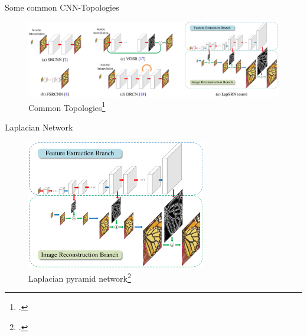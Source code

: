 \documentclass{beamer}
\begin{document}
\begin{frame}{Some common CNN-Topologies}
  \begin{figure}[h]
    \centering
    \includegraphics[width=\textwidth]{sr_architectures.png}
    \caption{Common Topologies\footcite{LapSRN}}
    \label{fig:lap-srn}
  \end{figure}
\end{frame}

\begin{frame}{Laplacian Network}
  \begin{figure}[h]
    \centering
    \includegraphics[width=0.7\textwidth]{lap_srn.png}
    \caption{Laplacian pyramid network\footcite{LapSRN}}
    \label{fig:lap-srn}
  \end{figure}
\end{frame}
\end{document}
